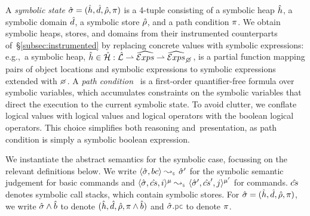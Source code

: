 A \emph{symbolic state} $\hat{\sigma} = (\hat{h}, \hat{d}, \hat\rho, \pi)$ is a 4-tuple consisting of a 
symbolic heap $\hat{h}$, a symbolic domain $\hat{d}$, a symbolic store $\hat\rho$, and a path condition $\pi$. 
We obtain symbolic heaps, stores, and domains from their instrumented 
counterparts of~\S\ref{subsec:instrumented} by replacing concrete values with symbolic expressions: e.g.,~a symbolic heap, $\sheap \in \sheaps : \slocs \partialmap \sexprs \partialmap \setext{\sexprs}{\none}$,
is a partial function mapping pairs of object locations and symbolic expressions to symbolic expressions
extended with $\none$. 
A \emph{path condition}~\cite{symb:exec:survey} is a first-order quantifier-free formula over symbolic variables, 
which accumulates constraints on the symbolic variables that direct 
the execution to the current symbolic state.
To avoid clutter, we conflate logical values with \jsil logical values and \jsil logical 
operators with the boolean logical operators. 
This choice simplifies both reasoning 
and~presentation, as path condition is simply a \jsil symbolic boolean expression. 

We instantiate the abstract semantics for the symbolic case, 
focussing on the relevant definitions below. %
We write $\absbsemrule{\sstate, \bcmd}{\sstate'}{\symbolic}$ for the symbolic semantic 
judgement for basic commands and $\abssemrule{\sstate, \scs, i}{\sstate', \scs', j}{\mode}{\mode'}{\symbolic}$ 
for commands. $\hat{cs}$ denotes symbolic call stacks, which contain symbolic stores.
For $\hat{\sigma} = (\hat{h}, \hat{d}, \hat\rho, \pi)$, we write $\hat{\sigma} \wedge \hat{b}$ to denote $(\hat{h}, \hat{d}, \hat\rho, \pi \wedge \hat{b})$ and $\sstate.\pcsel\!$ to denote $\pi$.


